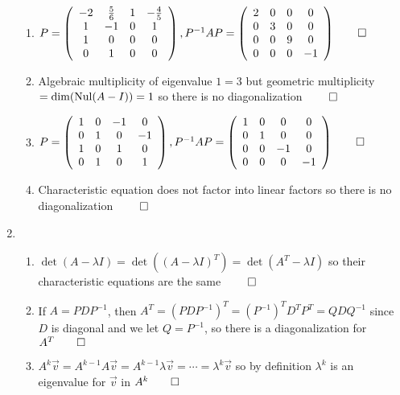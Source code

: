 \documentclass[12pt, a4paper]{article}
\begin{document}
\begin{enumerate}[Q\arabic*.]
\begin{enumerate}[(\alph*)]
      \item $P = \left(\begin{array}{cccc} -2 & \frac{5}{6} & 1 & -\frac{4}{5}\\ 1 & -1 & 0 & 1\\ 1 & 0 & 0 & 0\\ 0 & 1 & 0 & 0 \end{array}\right), P^{-1}AP = \left(\begin{array}{cccc} 2 & 0 & 0 & 0\\ 0 & 3 & 0 & 0\\ 0 & 0 & 9 & 0\\ 0 & 0 & 0 & -1 \end{array}\right) \qed$

      \item Algebraic multiplicity of eigenvalue $1 = 3$ but geometric multiplicity $= \dim(\operatorname{Nul}(A-I)) = 1$ so there is no diagonalization $\qed$

      \item $P = \left(\begin{array}{cccc} 1 & 0 & -1 & 0\\ 0 & 1 & 0 & -1\\ 1 & 0 & 1 & 0\\ 0 & 1 & 0 & 1 \end{array}\right), P^{-1}AP = \left(\begin{array}{cccc} 1 & 0 & 0 & 0\\ 0 & 1 & 0 & 0\\ 0 & 0 & -1 & 0\\ 0 & 0 & 0 & -1 \end{array}\right) \qed$

      \item Characteristic equation does not factor into linear factors so there is no diagonalization $\qed$
    \end{enumerate}

  \item 
    \begin{enumerate}[(\alph*)]
      \item $\det(A - \lambda I) = \det((A-\lambda I)^{T}) = \det(A^T - \lambda I)$ so their characteristic equations are the same $\qed$

      \item If $A = PDP^{-1}$, then $A^T = (PDP^{-1})^T = (P^{-1})^TD^TP^T = QDQ^{-1}$ since $D$ is diagonal and we let $Q = P^{-1}$, so there is a diagonalization for $A^T \qed$

      \item $A^k\vec{v} = A^{k-1}A\vec{v} = A^{k-1}\lambda \vec{v} = \cdots = \lambda^k \vec{v}$ so by definition $\lambda^k$ is an eigenvalue for $\vec{v}$ in $A^k \qed$


\end{enumerate}
\end{enumerate}
\end{document}
